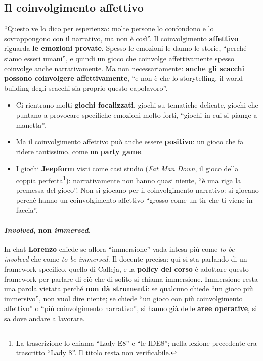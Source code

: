 \subsection{Il coinvolgimento affettivo}



``Questo ve lo dico per esperienza: molte persone lo confondono e lo
sovrappongono con il narrativo, ma non è così''. Il coinvolgimento
\textbf{affettivo} riguarda \textbf{le emozioni provate}. Spesso le emozioni le
danno le storie, ``perché siamo esseri umani'', e quindi un gioco che coinvolge
affettivamente spesso coinvolge anche narrativamente. Ma non necessariamente:
\textbf{anche gli scacchi possono coinvolgere affettivamente}, ``e non è che lo
storytelling, il world building degli scacchi sia proprio questo capolavoro''.
\begin{itemize}
  \item Ci rientrano molti \textbf{giochi focalizzati}, giochi su tematiche
        delicate, giochi che puntano a provocare specifiche emozioni molto
        forti, ``giochi in cui si piange a manetta''.
  \item Ma il coinvolgimento affettivo può anche essere \textbf{positivo}: un
        gioco che fa ridere tantissimo, come un \textbf{party game}.
  \item I giochi \textbf{Jeepform} visti come casi studio (\emph{Fat Man Down}, il
        gioco della coppia perfetta\footnote{La trascrizione lo chiama ``Lady
        E8'' e ``le IDE8''; nella lezione precedente era trascritto ``Lady 8''.
        Il titolo resta non verificabile.}): narrativamente non hanno quasi
        niente, ``è una riga la premessa del gioco''. Non si giocano per il
        coinvolgimento narrativo: si giocano perché hanno un coinvolgimento
        affettivo ``grosso come un tir che ti viene in faccia''.
\end{itemize}

\paragraph{\emph{Involved}, non \emph{immersed}.} In chat \textbf{Lorenzo} chiede
se allora ``immersione'' vada intesa più come \emph{to be involved} che come
\emph{to be immersed}. Il docente precisa: qui si sta parlando di un framework
specifico, quello di Calleja, e la \textbf{policy del corso} è adottare questo
framework per parlare di ciò che di solito si chiama immersione. Immersione resta
una parola vietata perché \textbf{non dà strumenti}: se qualcuno chiede ``un
gioco più immersivo'', non vuol dire niente; se chiede ``un gioco con più
coinvolgimento affettivo'' o ``più coinvolgimento narrativo'', si hanno già delle
\textbf{aree operative}, si sa dove andare a lavorare.

